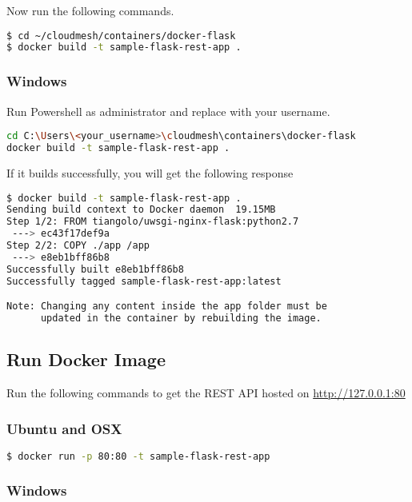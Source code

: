 Now run the following commands.

\begin{lstlisting}[language=bash]
$ cd ~/cloudmesh/containers/docker-flask
$ docker build -t sample-flask-rest-app .
\end{lstlisting}

\subsubsection{Windows}

Run Powershell as administrator and replace with your username.

\begin{lstlisting}[language=bash]
cd C:\Users\<your_username>\cloudmesh\containers\docker-flask
docker build -t sample-flask-rest-app .
\end{lstlisting}

If it builds successfully, you will get the following response

\begin{lstlisting}[language=bash]
$ docker build -t sample-flask-rest-app .
Sending build context to Docker daemon  19.15MB
Step 1/2: FROM tiangolo/uwsgi-nginx-flask:python2.7
 ---> ec43f17def9a
Step 2/2: COPY ./app /app
 ---> e8eb1bff86b8
Successfully built e8eb1bff86b8
Successfully tagged sample-flask-rest-app:latest

Note: Changing any content inside the app folder must be
      updated in the container by rebuilding the image.
\end{lstlisting}

\subsection{Run Docker Image}

Run the following commands to get the REST API hosted on
\url{http://127.0.0.1:80}

\subsubsection{Ubuntu and OSX}

\begin{lstlisting}[language=bash]
$ docker run -p 80:80 -t sample-flask-rest-app
\end{lstlisting}

\subsubsection{Windows}

